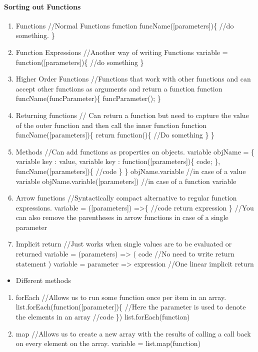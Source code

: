 \documentclass[
  paper=a4,
  ,captions=tableheading
]{scrartcl}
\providecommand{\tightlist}{%
  \setlength{\itemsep}{0pt}\setlength{\parskip}{0pt}}
\begin{document}
\hypertarget{sorting-out-functions}{%
\paragraph{Sorting out Functions}\label{sorting-out-functions}}

\begin{enumerate}
\def\labelenumi{\arabic{enumi}.}
\tightlist
\item
  Functions //Normal Functions function funcName({[}parameters{]})\{
  //do something. \}
\item
  Function Expressions //Another way of writing Functions variable =
  function({[}parameters{]})\{ //do something \}
\item
  Higher Order Functions //Functions that work with other functions and
  can accept other functions as arguments and return a function function
  funcName(funcParameter)\{ funcParameter(); \}
\item
  Returning functions // Can return a function but need to capture the
  value of the outer function and then call the inner function function
  funcName({[}parameters{]})\{ return function()\{ //Do something \} \}
\item
  Methods //Can add functions as properties on objects. variable objName
  = \{ variable key : value, variable key : function({[}parameters{]})\{
  code; \}, funcName({[}parameters{]})\{ //code \} \} objName.variable
  //in case of a value variable objName.variable({[}parameters{]}) //in
  case of a function variable
\item
  Arrow functions //Syntactically compact alternative to regular
  function expressions. variable = ({[}parameters{]}) =\textgreater\{
  //code return expression \} //You can also remove the parentheses in
  arrow functions in case of a single parameter
\item
  Implicit return //Just works when single values are to be evaluated or
  returned variable = (parameters) =\textgreater{} ( code //No need to
  write return statement ) variable = parameter =\textgreater{}
  expression //One linear implicit return
\end{enumerate}

\begin{itemize}
\tightlist
\item
  Different methods
\end{itemize}

\begin{enumerate}
\def\labelenumi{\arabic{enumi}.}
\tightlist
\item
  forEach //Allows us to run some function once per item in an array.
  list.forEach(function({[}parameter{]})\{ //Here the parameter is used
  to denote the elements in an array //code \}) list.forEach(function)
\item
  map //Allows us to create a new array with the results of calling a
  call back on every element on the array. variable = list.map(function)
\end{enumerate}
\end{document}

